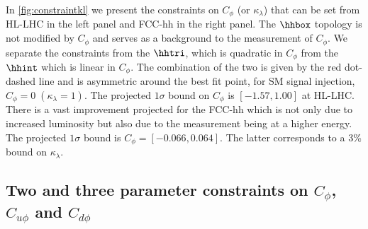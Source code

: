In \autoref{fig:constraintkl} we present the constraints on $C_\phi$ (or $\kappa_\lambda$) that can be set from HL-LHC in the left panel and FCC-hh in the right panel. The $\hhbox$ topology is not modified by $C_\phi$ and serves as a background to the measurement of $C_\phi$. We separate the constraints from the $\hhtri$, which is quadratic in $C_\phi$ from the $\hhint$ which is linear in $C_\phi$. The combination of the two is given by the red dot-dashed line and is asymmetric around the best fit point, for SM signal injection, $C_\phi=0 \; (\kappa_\lambda=1)$. The projected $1\sigma$ bound on $C_\phi$ is $[-1.57, 1.00]$ at HL-LHC. There is a vast improvement projected for the FCC-hh which is not only due to increased luminosity but also due to the measurement being at a higher energy. The projected $1\sigma$ bound is $C_\phi = [-0.066, 0.064]$. The latter corresponds to a 3\% bound on $\kappa_\lambda$.


\subsection{Two and three parameter constraints on \texorpdfstring{$C_\phi$}{CH},  \texorpdfstring{$C_{u\phi}$}{CuH} and \texorpdfstring{$C_{d\phi}$}{CdH}}
\label{sec:multiparam}

